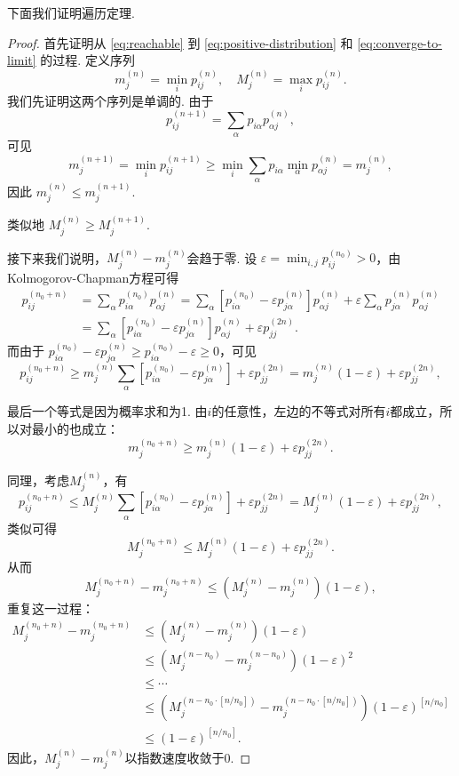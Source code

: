 下面我们证明遍历定理.
\begin{proof}
首先证明从 \eqref{eq:reachable} 到 \eqref{eq:positive-distribution} 和 \eqref{eq:converge-to-limit} 的过程. 定义序列
\[
m_j^{(n)} = \min _i p_{i j}^{(n)}, \quad M_j^{(n)} = \max _i p_{i j}^{(n)}.
\]
我们先证明这两个序列是单调的. 由于
\[
p_{i j}^{(n+1)} = \sum_\alpha p_{i \alpha} p_{\alpha j}^{(n)},
\]
可见
\[
m_j^{(n+1)} = \min _i p_{i j}^{(n+1)} \geq \min _i \sum_\alpha p_{i \alpha} \min _\alpha p_{\alpha j}^{(n)} = m_j^{(n)},
\]
因此 $m_j^{(n)} \leq m_j^{(n+1)}$. 

类似地 $M_j^{(n)} \geq M_j^{(n+1)}$. 

接下来我们说明，$M_j^{(n)} - m_j^{(n)}$会趋于零. 设 $\varepsilon = \min _{i, j} p_{i j}^{\left(n_0\right)} > 0$，由Kolmogorov-Chapman方程可得
\begin{align*}
    p_{i j}^{\left(n_0+n\right)} &= \sum_\alpha p_{i \alpha}^{\left(n_0\right)} p_{\alpha j}^{(n)} = \sum_\alpha\left[p_{i \alpha}^{\left(n_0\right)} - \varepsilon p_{j \alpha}^{(n)}\right] p_{\alpha j}^{(n)} + \varepsilon \sum_\alpha p_{j \alpha}^{(n)} p_{\alpha j}^{(n)} \\
    &= \sum_\alpha\left[p_{i \alpha}^{\left(n_0\right)} - \varepsilon p_{j \alpha}^{(n)}\right] p_{\alpha j}^{(n)} + \varepsilon p_{j j}^{(2 n)}.
\end{align*}
而由于 $p_{i \alpha}^{\left(n_0\right)} - \varepsilon p_{j \alpha}^{(n)} \geq p_{i \alpha}^{\left(n_0\right)} - \varepsilon \geq 0$，可见
\[
p_{i j}^{\left(n_0+n\right)} \geq m_j^{(n)} \sum_\alpha\left[p_{i \alpha}^{\left(n_0\right)} - \varepsilon p_{j \alpha}^{(n)}\right] + \varepsilon p_{j j}^{(2 n)} = m_j^{(n)} (1-\varepsilon) + \varepsilon p_{j j}^{(2 n)},
\]

最后一个等式是因为概率求和为1. 由$i$的任意性，左边的不等式对所有$i$都成立，所以对最小的也成立：
\[
m_j^{\left(n_0+n\right)} \geq m_j^{(n)} (1-\varepsilon) + \varepsilon p_{j j}^{(2 n)}.
\]

同理，考虑$M_j^{(n)}$，有
\[
p_{i j}^{\left(n_0+n\right)} \leq M_j^{(n)} \sum_\alpha\left[p_{i \alpha}^{\left(n_0\right)} - \varepsilon p_{j \alpha}^{(n)}\right] + \varepsilon p_{j j}^{(2 n)}= M_j^{(n)} (1-\varepsilon) + \varepsilon p_{j j}^{(2 n)},
\]
类似可得
\[
M_j^{\left(n_0+n\right)} \leq M_j^{(n)} (1-\varepsilon) + \varepsilon p_{j j}^{(2 n)}.
\]
从而
\[
M_j^{\left(n_0+n\right)} - m_j^{\left(n_0+n\right)} \leq \left(M_j^{(n)} - m_j^{(n)}\right)(1-\varepsilon),
\]
重复这一过程：
\begin{align*}
M_j^{\left(n_0+n\right)} - m_j^{\left(n_0+n\right)} &\leq \left(M_j^{(n)} - m_j^{(n)}\right)(1-\varepsilon) \\
&\leq \left(M_j^{(n-n_0)} - m_j^{(n-n_0)}\right)(1-\varepsilon)^2 \\
&\leq \cdots \\
&\leq \left(M_j^{(n-n_0\cdot[n/n_0])} - m_j^{(n-n_0\cdot[n/n_0])}\right)(1-\varepsilon)^{\left[n/n_0\right]} \\
&\leq (1-\varepsilon)^{\left[n/n_0\right]}.
\end{align*}
因此，$M_j^{(n)} - m_j^{(n)}$以指数速度收敛于$0$.


\end{proof}
